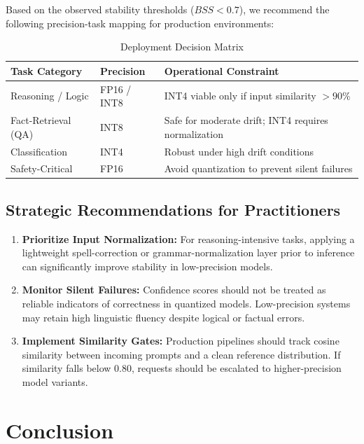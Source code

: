 \documentclass[conference]{IEEEtran}
\begin{document}
Based on the observed stability thresholds ($BSS < 0.7$), we recommend the following precision-task mapping for production environments:

\begin{table}[t]
\centering
\caption{Deployment Decision Matrix}
\begin{tabular}{|p{2.2cm}|p{2.2cm}|p{3.5cm}|}
\hline
\textbf{Task Category} & \textbf{Precision} & \textbf{Operational Constraint} \\
\hline
Reasoning / Logic & FP16 / INT8 & INT4 viable only if input similarity $> 90\%$ \\
\hline
Fact-Retrieval (QA) & INT8 & Safe for moderate drift; INT4 requires normalization \\
\hline
Classification & INT4 & Robust under high drift conditions \\
\hline
Safety-Critical & FP16 & Avoid quantization to prevent silent failures \\
\hline
\end{tabular}
\end{table}

\subsection{Strategic Recommendations for Practitioners}

\begin{enumerate}
\item \textbf{Prioritize Input Normalization:} For reasoning-intensive tasks, applying a lightweight spell-correction or grammar-normalization layer prior to inference can significantly improve stability in low-precision models.
\item \textbf{Monitor Silent Failures:} Confidence scores should not be treated as reliable indicators of correctness in quantized models. Low-precision systems may retain high linguistic fluency despite logical or factual errors.
\item \textbf{Implement Similarity Gates:} Production pipelines should track cosine similarity between incoming prompts and a clean reference distribution. If similarity falls below $0.80$, requests should be escalated to higher-precision model variants.
\end{enumerate}



\section{Conclusion}
\end{document}
